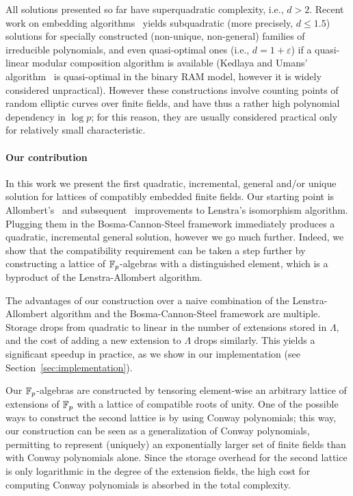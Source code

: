 \documentclass{sig-alternate}
\begin{document}
All solutions presented so far have superquadratic complexity, i.e.,
$d>2$. %
Recent work on embedding algorithms~\cite{DoSc12,DeDoSc13,DeDoSc2014}
yields subquadratic (more precisely, $d\le 1.5$) solutions for
specially constructed (non-unique, non-general) families of
irreducible polynomials, and even quasi-optimal ones (i.e.,
$d=1+\varepsilon$) if a quasi-linear modular composition algorithm is
available (Kedlaya and Umans' algorithm~\cite{KeUm11} is quasi-optimal
in the binary RAM model, however it is widely considered
unpractical). %
However these constructions involve counting points of random elliptic
curves over finite fields, and have thus a rather high polynomial
dependency in $\log p$; for this reason, they are usually considered
practical only for relatively small characteristic.


\paragraph{Our contribution}
In this work we present the first
quadratic, %
incremental, general and/or unique %
solution for lattices of compatibly embedded finite fields. %
Our starting point is Allombert's~\cite{Allombert02} and
subsequent~\cite{brieulle2018computing} improvements to Lenstra's
isomorphism algorithm. %
Plugging them in the Bosma-Cannon-Steel framework immediately produces
a quadratic, incremental general solution, however we go much
further. %
Indeed, we show that the compatibility requirement can be taken a step
further by constructing a lattice of $\mathbb{F}_p$-algebras with a
distinguished element, which is a byproduct of the Lenstra-Allombert
algorithm.

The advantages of our construction over a naive combination of the
Lenstra-Allombert algorithm and the Bosma-Cannon-Steel framework are
multiple. %
Storage drops from quadratic to linear in the number of extensions
stored in $\Lambda$, and the cost of adding a new extension to
$\Lambda$ drops similarly. %
This yields a significant speedup in practice, as we show in our
implementation (see Section~\ref{sec:implementation}).

Our $\mathbb{F}_p$-algebras are constructed by tensoring element-wise an
arbitrary lattice of extensions of $\mathbb{F}_p$ with a lattice of compatible
roots of unity. %
One of the possible ways to construct the second lattice is by using
Conway polynomials; this way, our construction can be seen as a
generalization of Conway polynomials, permitting to represent
(uniquely) an exponentially larger set of finite fields than with
Conway polynomials alone. %
Since the storage overhead for the second lattice is only logarithmic
in the degree of the extension fields, the high cost for computing
Conway polynomials is absorbed in the total complexity.
\end{document}
